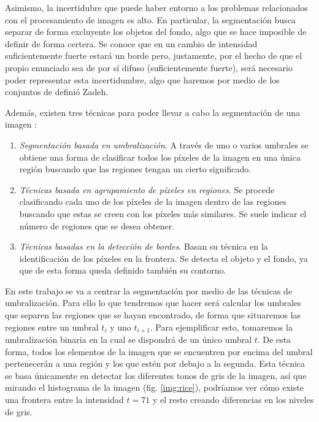 Asimismo, la incertidubre que puede haber entorno a los problemas relacionados con el procesamiento de imagen es alto. En particular, la segmentación busca separar de forma excluyente los objetos del fondo, algo que se hace imposible de definir de forma certera. Se conoce que en un cambio de intensidad suficientemente fuerte estará un borde pero, justamente, por el hecho de que el propio enunciado sea de por sí difuso (suficientemente fuerte), será necesario poder representar esta incertidumbre, algo que haremos por medio de los conjuntos de definió Zadeh.

Además, existen tres técnicas para poder llevar a cabo la segmentación de una imagen \cite{lib:gonzalez}:
\begin{enumerate}[label=\alph*)]
	\item {\em Segmentación basada en umbralización}. A través de uno o varios umbrales se obtiene una forma de clasificar todos los píxeles de la imagen en una única región buscando que las regiones tengan un cierto significado. 
	\item {\em Técnicas basada en agrupamiento de píxeles en regiones}. Se procede clasificando cada uno de los píxeles de la imagen dentro de las regiones buscando que estas se creen con los píxeles más similares. Se suele indicar el número de regiones que se desea obtener.
	\item {\em Técnicas basadas en la detección de bordes}. Basan su técnica en la identificación de los píxeles en la frontera. Se detecta el objeto y el fondo, ya que de esta forma queda definido también su contorno.
\end{enumerate}

En este trabajo se va a centrar la segmentación por medio de las técnicas de umbralización. Para ello lo que tendremos que hacer será calcular los umbrales que separen las regiones que se hayan encontrado, de forma que situaremos las regiones entre un umbral $t_{i}$ y uno $t_{i+1}$. Para ejemplificar esto, tomaremos la umbralización binaria en la cual se dispondrá de un único umbral $t$. De esta forma, todos los elementos de la imagen que se encuentren por encima del umbral pertenecerán a una región  y los que estén por debajo a la segunda. Esta técnica se basa únicamente en detectar los diferentes tonos de gris de la imagen, así que mirando el histograma de la imagen (fig. \ref{img:rice}), podríamos ver cómo existe una frontera entre la intensidad $t=71$ y el resto creando diferencias en los niveles de gris. \cite{art:refbarrenechea}

